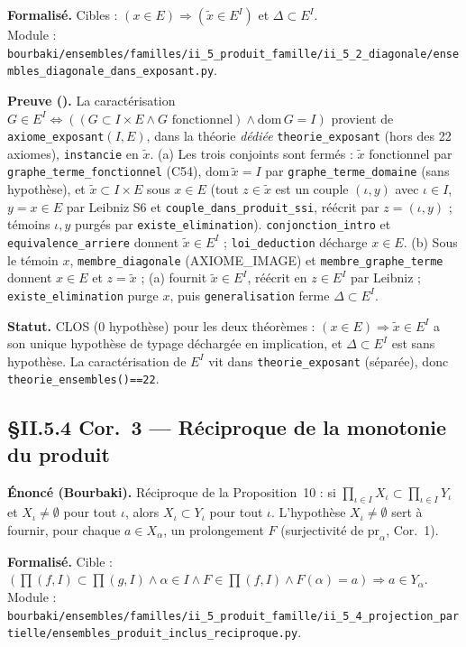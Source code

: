 \textbf{Formalisé.} Cibles : $(x\in E)\Rightarrow(\tilde{x}\in E^I)$ et $\Delta\subset E^I$. \\
Module : \texttt{bourbaki/ensembles/familles/ii\_5\_produit\_famille/ii\_5\_2\_diagonale/ensembles\_diagonale\_dans\_exposant.py}.

\textbf{Preuve (\Nstar).} La caractérisation $G\in E^I\Leftrightarrow((G\subset I\times E\wedge G\text{ fonctionnel})\wedge \mathrm{dom}\,G=I)$ provient de \texttt{axiome\_exposant}$(I,E)$, dans la théorie \emph{dédiée} \texttt{theorie\_exposant} (hors des 22 axiomes), \texttt{instancie} en $\tilde{x}$. (a) Les trois conjoints sont fermés : $\tilde{x}$ fonctionnel par \texttt{graphe\_terme\_fonctionnel} (C54), $\mathrm{dom}\,\tilde{x}=I$ par \texttt{graphe\_terme\_domaine} (sans hypothèse), et $\tilde{x}\subset I\times E$ sous $x\in E$ (tout $z\in\tilde{x}$ est un couple $(\iota,y)$ avec $\iota\in I$, $y=x\in E$ par Leibniz S6 et \texttt{couple\_dans\_produit\_ssi}, réécrit par $z=(\iota,y)$ ; témoins $\iota,y$ purgés par \texttt{existe\_elimination}). \texttt{conjonction\_intro} et \texttt{equivalence\_arriere} donnent $\tilde{x}\in E^I$ ; \texttt{loi\_deduction} décharge $x\in E$. (b) Sous le témoin $x$, \texttt{membre\_diagonale} (AXIOME\_IMAGE) et \texttt{membre\_graphe\_terme} donnent $x\in E$ et $z=\tilde{x}$ ; (a) fournit $\tilde{x}\in E^I$, réécrit en $z\in E^I$ par Leibniz ; \texttt{existe\_elimination} purge $x$, puis \texttt{generalisation} ferme $\Delta\subset E^I$.

\textbf{Statut.} CLOS (0 hypothèse) pour les deux théorèmes : $(x\in E)\Rightarrow\tilde{x}\in E^I$ a son unique hypothèse de typage déchargée en implication, et $\Delta\subset E^I$ est sans hypothèse. La caractérisation de $E^I$ vit dans \texttt{theorie\_exposant} (séparée), donc \texttt{theorie\_ensembles()==22}.


\subsection{§II.5.4 Cor.~3 --- Réciproque de la monotonie du produit}
\textbf{Énoncé (Bourbaki).} Réciproque de la Proposition~10 : si $\prod_{\iota\in I}X_\iota\subset\prod_{\iota\in I}Y_\iota$ et $X_\iota\neq\emptyset$ pour tout $\iota$, alors $X_\iota\subset Y_\iota$ pour tout $\iota$. L'hypothèse $X_\iota\neq\emptyset$ sert à fournir, pour chaque $a\in X_\alpha$, un prolongement $F$ (surjectivité de $\mathrm{pr}_\alpha$, Cor.~1).

\textbf{Formalisé.} Cible : $(\prod(f,I)\subset\prod(g,I)\wedge \alpha\in I\wedge F\in\prod(f,I)\wedge F(\alpha)=a)\Rightarrow a\in Y_\alpha$. \\
Module : \texttt{bourbaki/ensembles/familles/ii\_5\_produit\_famille/ii\_5\_4\_projection\_partielle/ensembles\_produit\_inclus\_reciproque.py}.


